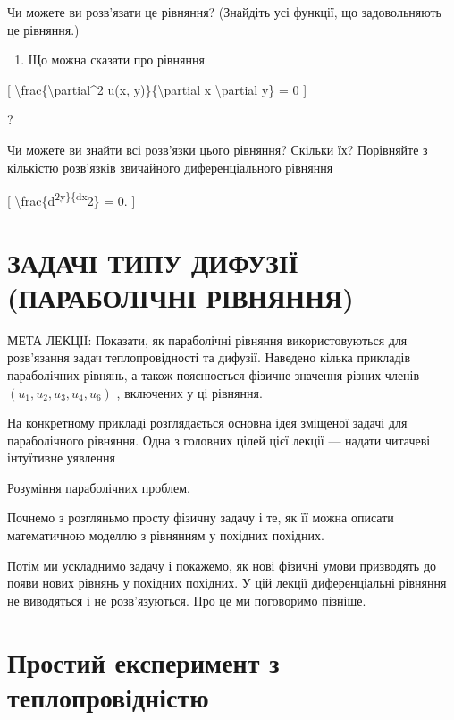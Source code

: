 \documentclass[
]{article}
\providecommand{\tightlist}{%
  \setlength{\itemsep}{0pt}\setlength{\parskip}{0pt}}
\begin{document}
Чи можете ви розв'язати це рівняння? (Знайдіть усі функції, що
задовольняють це рівняння.)

\begin{enumerate}
\def\labelenumi{\arabic{enumi}.}
\setcounter{enumi}{4}
\tightlist
\item
  Що можна сказати про рівняння
\end{enumerate}

{[} \textbackslash frac\{\textbackslash partial\^{}2 u(x,
y)\}\{\textbackslash partial x \textbackslash partial y\} = 0 {]}

?

Чи можете ви знайти всі розв'язки цього рівняння? Скільки їх? Порівняйте
з кількістю розв'язків звичайного диференціального рівняння

{[} \textbackslash frac\{d\textsuperscript{2y\}\{dx}2\} = 0. {]}

\section{ЗАДАЧІ ТИПУ ДИФУЗІЇ (ПАРАБОЛІЧНІ
РІВНЯННЯ)}\label{ux437ux430ux434ux430ux447ux456-ux442ux438ux43fux443-ux434ux438ux444ux443ux437ux456ux457-ux43fux430ux440ux430ux431ux43eux43bux456ux447ux43dux456-ux440ux456ux432ux43dux44fux43dux43dux44f}

МЕТА ЛЕКЦІЇ: Показати, як параболічні рівняння використовуються для
розв'язання задач теплопровідності та дифузії. Наведено кілька прикладів
параболічних рівнянь, а також пояснюється фізичне значення різних членів
\((u_1, u_2, u_3, u_4, u_6)\) , включених у ці рівняння.

На конкретному прикладі розглядається основна ідея зміщеної задачі для
параболічного рівняння. Одна з головних цілей цієї лекції --- надати
читачеві інтуїтивне уявлення

Розуміння параболічних проблем.

Почнемо з розгляньмо просту фізичну задачу і те, як її можна описати
математичною моделлю з рівнянням у похідних похідних.

Потім ми ускладнимо задачу і покажемо, як нові фізичні умови призводять
до появи нових рівнянь у похідних похідних. У цій лекції диференціальні
рівняння не виводяться і не розв'язуються. Про це ми поговоримо пізніше.

\section{Простий експеримент з
теплопровідністю}\label{ux43fux440ux43eux441ux442ux438ux439-ux435ux43aux441ux43fux435ux440ux438ux43cux435ux43dux442-ux437-ux442ux435ux43fux43bux43eux43fux440ux43eux432ux456ux434ux43dux456ux441ux442ux44e}
\end{document}
